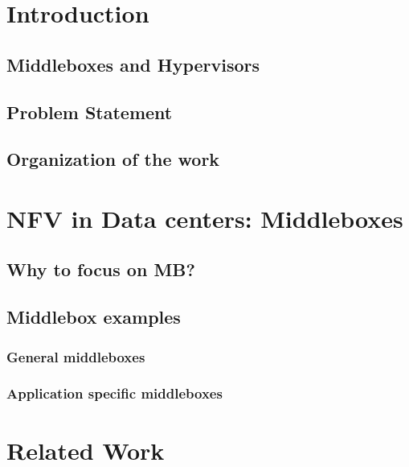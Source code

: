 \documentclass[a4paper,11pt]{report}
\begin{document}
\newpage
\tableofcontents
\listoffigures
\listoftables
\newpage
\chapter{Introduction}
\section{Middleboxes and Hypervisors}
\section{Problem Statement}        
\section{Organization of the work}  

\chapter{NFV in Data centers: Middleboxes}
\section{Why to focus on MB?}
\section{Middlebox examples}
\subsection{General middleboxes}
\subsection{Application specific middleboxes}

\chapter{Related Work}
\end{document}
